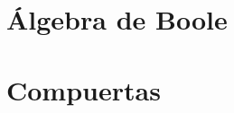 \documentclass{beamer}
\begin{document}
\section{Álgebra de Boole}
\begin{frame}
\frametitle{}

\end{frame}

\begin{frame}
\frametitle{}

\end{frame}

\section{Compuertas}

\begin{frame}
\frametitle{}

\end{frame}

\begin{frame}
\frametitle{}

\end{frame}

\begin{frame}
\frametitle{}

\end{frame}

\begin{frame}
\frametitle{}

\end{frame}

\begin{frame}
\frametitle{}

\end{frame}

\begin{frame}
\frametitle{}

\end{frame}

\begin{frame}
\frametitle{}

\end{frame}
\end{document}

